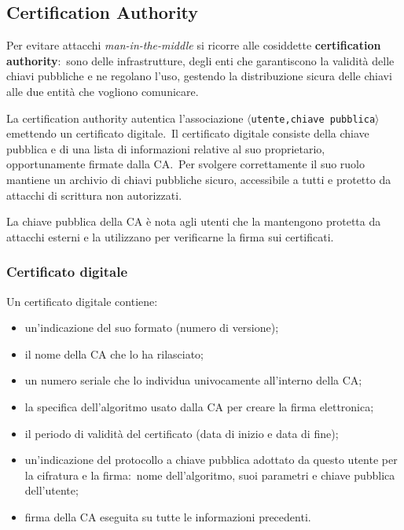 \subsection{Certification Authority}

Per evitare attacchi \textit{man-in-the-middle} si ricorre alle cosiddette \textbf{certification authority}:\ sono delle infrastrutture, degli enti che garantiscono la validità delle chiavi pubbliche e ne regolano l'uso, gestendo la distribuzione sicura delle chiavi alle due entità che vogliono comunicare.\

La certification authority autentica l'associazione $\langle$\texttt{utente,chiave pub\-blica}$\rangle$ emettendo un certificato digitale.\
Il certificato digitale consiste della chiave pubblica e di una lista di informazioni relative al suo proprietario, opportunamente firmate dalla CA.\
Per svolgere correttamente il suo ruolo mantiene un archivio di chiavi pubbliche sicuro, accessibile a tutti e protetto da attacchi di scrittura non autorizzati.

La chiave pubblica della CA è nota agli utenti che la mantengono protetta da attacchi esterni e la utilizzano per verificarne la firma sui certificati.\

\subsubsection{Certificato digitale}

Un certificato digitale contiene:

\begin{itemize}
    \item un'indicazione del suo formato (numero di versione);
    \item il nome della CA che lo ha rilasciato;
    \item un numero seriale che lo individua univocamente all'interno della CA;
    \item la specifica dell'algoritmo usato dalla CA per creare la firma elettronica;
    \item il periodo di validità del certificato (data di inizio e data di fine);
    \item un'indicazione del protocollo a chiave pubblica adottato da questo utente per la cifratura e la firma:\ nome dell'algoritmo, suoi parametri e chiave pubblica dell'utente;
    \item firma della CA eseguita su tutte le informazioni precedenti.
\end{itemize}

